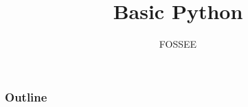 \documentclass[12pt,presentation]{beamer}
\title{Basic Python}
\author[FOSSEE] {FOSSEE}
\institute[IIT Bombay] {Department of Aerospace Engineering\\IIT Bombay}
\date []{}
\begin{document}
\maketitle

\begin{frame}
\frametitle{Outline}
\setcounter{tocdepth}{3}
\tableofcontents
\end{frame}






\end{document}
